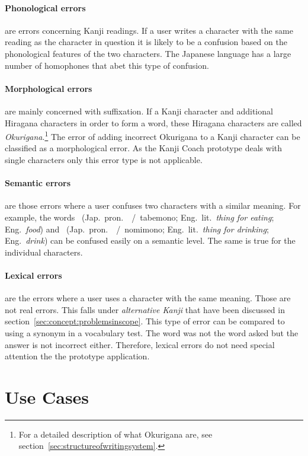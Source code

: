 \paragraph{Phonological errors} are errors concerning Kanji readings. If a user
writes a character with the same reading as the character in question it is 
likely to be a confusion based on the phonological features of the two 
characters. The Japanese language has a large number of homophones that abet
this type of confusion.

\paragraph{Morphological errors} are mainly concerned with suffixation.
If a Kanji character and additional Hiragana characters in order to form a word,
these Hiragana characters are called \emph{Okurigana}.\footnote{For a detailed 
description of what Okurigana are, see 
section~\ref{sec:structureofwritingsystem}.}
The error of adding incorrect Okurigana to a Kanji character can be classified
as a morphological error. As the Kanji Coach prototype deals with single 
characters only this error type is not applicable.

\paragraph{Semantic errors} are those errors where a user confuses two characters
with a similar meaning. For example, the words 
~(Jap.~pron.~~/~tabemono; 
Eng.~lit.~\emph{thing for eating}; Eng.~\emph{food}) 
and 
~(Jap.~pron.~~/~nomimono; 
Eng.~lit.~\emph{thing for drinking}; Eng.~\emph{drink})
can be confused easily on a semantic level. The same is true for the individual 
characters.
 
\paragraph{Lexical errors} are the errors where a user uses a character with the
same meaning. Those are not real errors. This falls under 
\emph{alternative Kanji} that have been discussed in 
section~\ref{sec:concept:problemsinscope}.
This type of error can be compared to using a synonym in a vocabulary test.
The word was not the word asked but the answer is not incorrect either.
Therefore, lexical errors do not need special attention the the prototype
application.

\section{Use Cases}
\label{sec:concept:usecases}

